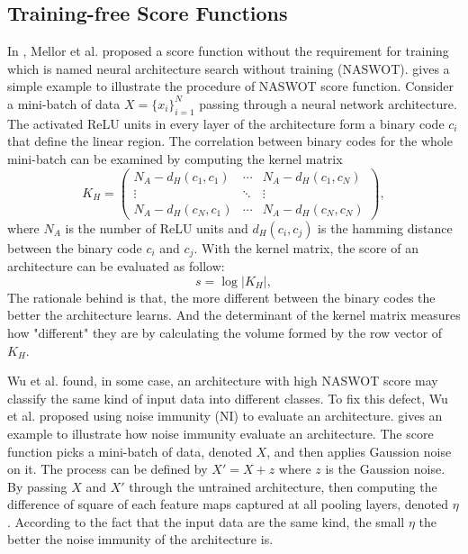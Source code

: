 \documentclass[sigconf]{acmart}
\begin{document}
    \subsection{Training-free Score Functions}
    In \cite{https://doi.org/10.48550/arxiv.2006.04647}, Mellor et al. proposed a 
    score function without the requirement for training which is named neural 
    architecture search without training (NASWOT).  
	gives a simple example to illustrate the procedure of NASWOT score function. 
    Consider a mini-batch of data $X=\{x_i\}^N_{i=1}$ passing through a neural network 
    architecture. The activated ReLU units in every layer of the architecture 
    form a binary code $c_i$ that define the linear region.
    The correlation between binary codes for the whole mini-batch can be examined 
    by computing the kernel matrix 
    \begin{equation}
        K_H=\begin{pmatrix}N_A-d_H(c_1,c_1)&\cdots&N_A-d_H(c_1,c_N)\\\vdots&\ddots&\vdots\\N_A-d_H(c_N,c_1)&\cdots&N_A-d_H(c_N,c_N)\end{pmatrix},
    \end{equation}
    where $N_A$ is the number of ReLU units and $d_H(c_i,c_j)$ is the hamming 
    distance between the binary code $c_i$ and $c_j$. 
    With the kernel matrix, the score of an architecture can be evaluated as 
    follow: 
    \begin{equation}
        s=\log\lvert K_H\rvert,
    \end{equation}
    The rationale behind is that, the more different between the binary codes 
    the better the architecture learns. And the determinant of the kernel matrix 
    measures how "different" they are by calculating the volume formed by the 
    row vector of $K_H$. 
    
	
    Wu et al. \cite{10092788} found, in some case, an architecture with high 
    NASWOT score may classify the same kind of input data into different classes. 
    To fix this defect, Wu et al. proposed using noise immunity (NI) to 
    evaluate an architecture.  gives an example to illustrate how 
    noise immunity evaluate an architecture. The score function picks a 
    mini-batch of data, denoted $X$, and then applies Gaussion noise on it. 
    The process can be defined by $X'=X+z$ where $z$ is the Gaussion noise. 
    By passing $X$ and $X'$ through the untrained architecture, then computing 
    the difference of square of each feature maps captured at all pooling layers, 
    denoted $\eta$. According to the fact that the input data are the same kind, 
    the small $\eta$ the better the noise immunity of the architecture is.
\end{document}
